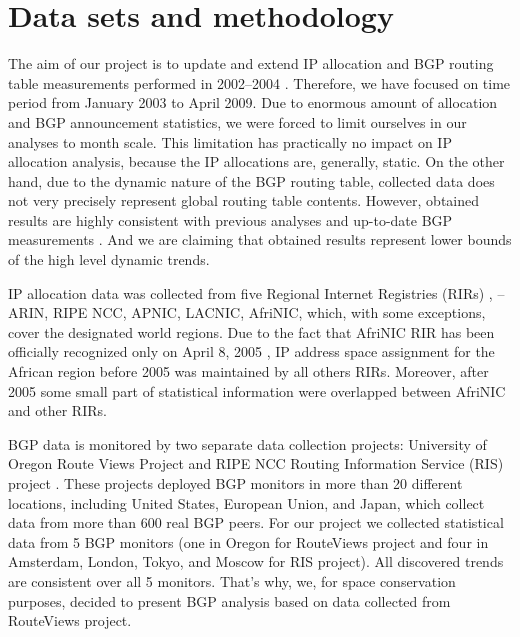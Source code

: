 \section{Data sets and methodology}
\label{sec:data sets}

The aim of our project is to update and extend IP allocation and BGP routing
table measurements performed in 2002--2004
\cite{Meng:2003:An-analysis-of-BGP-routing} \cite{Xu:2003:IPv4-Address}
\cite{Meng:2005:IPv4-address}. Therefore, we have focused on time period from
January 2003 to April 2009. Due to enormous amount of allocation and BGP
announcement statistics, we were forced to limit ourselves in our analyses to
month scale. This limitation has practically no impact on IP allocation
analysis, because the IP allocations are, generally, static. On the other
hand, due to the dynamic nature of the BGP routing table, collected data does
not very precisely represent global routing table contents. However, obtained
results are highly consistent with previous analyses
\cite{Meng:2005:IPv4-address} and up-to-date BGP measurements
\cite{::IPv4-Address-Report}. And we are claiming that obtained results
represent lower bounds of the high level dynamic trends.


IP allocation data was collected from five Regional Internet Registries (RIRs)
\cite{::IANA----Number}, -- ARIN, RIPE NCC, APNIC, LACNIC, AfriNIC, which,
with some exceptions, cover the designated world regions. Due to the fact that
AfriNIC RIR has been officially recognized only on April 8, 2005
\cite{AKPLOGAN:2005:AfriNIC-now-officially}, IP address space assignment for
the African region before 2005 was maintained by all others RIRs. Moreover,
after 2005 some small part of statistical information were overlapped between
AfriNIC and other RIRs.

BGP data is monitored by two separate data collection projects: University of
Oregon Route Views Project \cite{::Route-Views} and RIPE NCC Routing
Information Service (RIS) project \cite{::RIS}. These projects deployed BGP
monitors in more than 20 different locations, including United States,
European Union, and Japan, which collect data from more than 600 real BGP
peers. For our project we collected statistical data from 5 BGP monitors (one
in Oregon for RouteViews project and four in Amsterdam, London, Tokyo, and
Moscow for RIS project). All discovered trends are consistent over all 5
monitors. That's why, we, for space conservation purposes, decided to present
BGP analysis based on data collected from RouteViews project.

